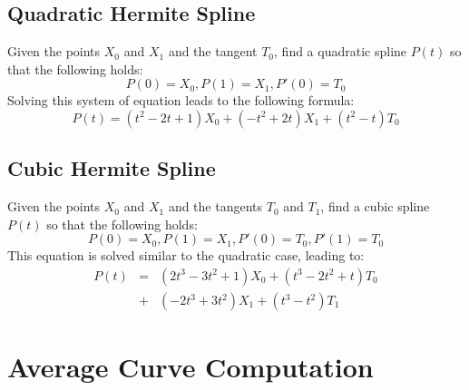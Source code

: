 \documentclass[journal, letterpaper]{IEEEtran}
\begin{document}
\subsection{Quadratic Hermite Spline}
Given the points $X_0$ and $X_1$ and the tangent $T_0$, find a quadratic spline $P(t)$ so that the following holds:
\begin{equation}
 P(0)=X_0, P(1)=X_1, P'(0)=T_0
\end{equation}
Solving this system of equation leads to the following formula:
\begin{equation}
 P(t) = (t^2-2t+1)X_0 + (-t^2+2t)X_1 + (t^2-t)T_0
\label{eq:QuadraticHermite}
\end{equation}

\subsection{Cubic Hermite Spline}
Given the points $X_0$ and $X_1$ and the tangents $T_0$ and $T_1$, find a cubic spline $P(t)$ so that the following holds:
\begin{equation}
 P(0)=X_0, P(1)=X_1, P'(0)=T_0, P'(1)=T_0
\end{equation}
This equation is solved similar to the quadratic case, leading to:
\begin{equation}
\begin{array}{rcl}
	P(t) &=& (2t^3-3t^2+1)X_0 + (t^3-2t^2+t)T_0 \\
	     &+& (-2t^3+3t^2)X_1 + (t^3-t^2)T_1
\end{array}
\label{eq:CubicHermite}
\end{equation}

\section{Average Curve Computation}\label{chapter:Tracing}
\end{document}
